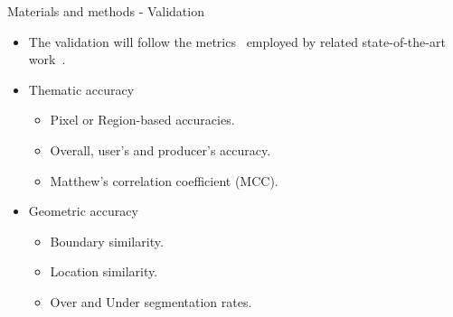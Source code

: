 \documentclass[xcolor=table]{beamer}
\begin{document}
\begin{frame}{Materials and methods - Validation}

	\begin{itemize}
		\item The validation will follow the metrics~\cite{sokolova2009} employed by related state-of-the-art work~\cite{waldner2021}.
	\end{itemize}		

	\begin{itemize}
	    \item Thematic accuracy
		\begin{itemize}
			\item Pixel or Region-based accuracies.
			\item Overall, user's and producer's accuracy.
			\item Matthew's correlation coefficient (MCC).
		\end{itemize}
		
		\item Geometric accuracy
		\begin{itemize}
			\item Boundary similarity.
			\item Location similarity.
			\item Over and Under segmentation rates.
		\end{itemize}
	\end{itemize}
		
\end{frame}

\end{document}
